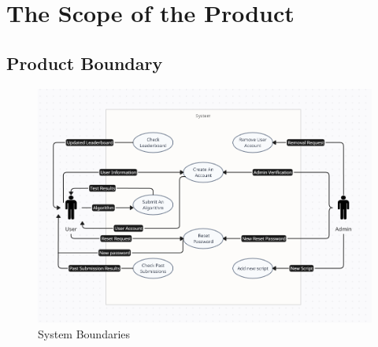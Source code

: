 \documentclass[12pt]{article}
\begin{document}
\section{The Scope of the Product}
\subsection{Product Boundary}
\begin{figure}[H]
    \centering
    \includegraphics[width=1\linewidth]{diagrams/Use.png}
    \caption{System Boundaries}
\end{figure}
\end{document}

